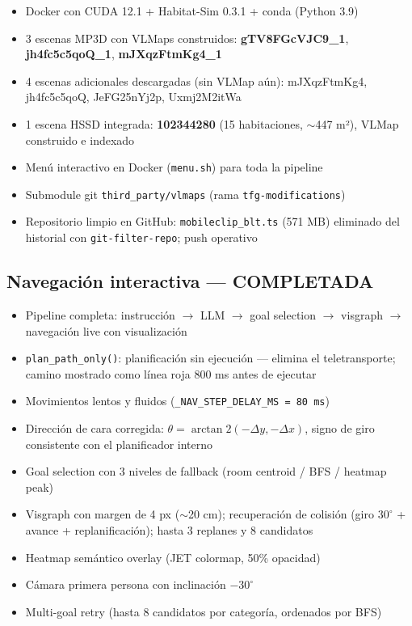\documentclass[11pt,a4paper]{article}
\begin{document}
\begin{itemize}
  \item[\checkmark] Docker con CUDA 12.1 + Habitat-Sim 0.3.1 + conda (Python 3.9)
  \item[\checkmark] 3 escenas MP3D con VLMaps construidos:
        \textbf{gTV8FGcVJC9\_1}, \textbf{jh4fc5c5qoQ\_1}, \textbf{mJXqzFtmKg4\_1}
  \item[\checkmark] 4 escenas adicionales descargadas (sin VLMap aún):
        mJXqzFtmKg4, jh4fc5c5qoQ, JeFG25nYj2p, Uxmj2M2itWa
  \item[\checkmark] 1 escena HSSD integrada: \textbf{102344280} (15 habitaciones, $\sim$447 m²),
        VLMap construido e indexado
  \item[\checkmark] Menú interactivo en Docker (\texttt{menu.sh}) para toda la pipeline
  \item[\checkmark] Submodule git \texttt{third\_party/vlmaps} (rama \texttt{tfg-modifications})
  \item[\checkmark] Repositorio limpio en GitHub: \texttt{mobileclip\_blt.ts} (571 MB) eliminado
        del historial con \texttt{git-filter-repo}; push operativo
\end{itemize}

\subsection{Navegación interactiva --- \textcolor{done}{COMPLETADA}}

\begin{itemize}
  \item[\checkmark] Pipeline completa: instrucción $\rightarrow$ LLM $\rightarrow$ goal selection
        $\rightarrow$ visgraph $\rightarrow$ navegación live con visualización
  \item[\checkmark] \texttt{plan\_path\_only()}: planificación sin ejecución --- elimina el
        teletransporte; camino mostrado como línea roja 800 ms antes de ejecutar
  \item[\checkmark] Movimientos lentos y fluidos (\texttt{\_NAV\_STEP\_DELAY\_MS = 80 ms})
  \item[\checkmark] Dirección de cara corregida:
        $\theta = \arctan2(-\Delta y, -\Delta x)$, signo de giro consistente con el
        planificador interno
  \item[\checkmark] Goal selection con 3 niveles de fallback (room centroid / BFS / heatmap peak)
  \item[\checkmark] Visgraph con margen de 4 px ($\sim$20 cm); recuperación de colisión
        (giro $30^\circ$ + avance + replanificación); hasta 3 replanes y 8 candidatos
  \item[\checkmark] Heatmap semántico overlay (JET colormap, 50\% opacidad)
  \item[\checkmark] Cámara primera persona con inclinación $-30^\circ$
  \item[\checkmark] Multi-goal retry (hasta 8 candidatos por categoría, ordenados por BFS)
\end{itemize}
\end{document}
